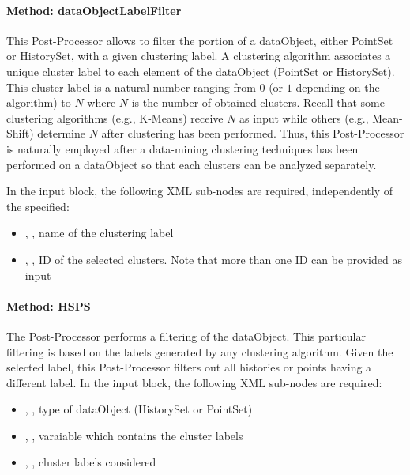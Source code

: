 \paragraph{Method: dataObjectLabelFilter}
This Post-Processor allows to filter the portion of a dataObject, either PointSet or HistorySet, with a given clustering label.
A clustering algorithm associates a unique cluster label to each element of the dataObject (PointSet or HistorySet).
This cluster label is a natural number ranging from $0$ (or $1$ depending on the algorithm) to $N$ where $N$ is the number of obtained clusters.
Recall that some clustering algorithms (e.g., K-Means) receive $N$ as input while others (e.g., Mean-Shift) determine $N$ after clustering has been performed.
Thus, this Post-Processor is naturally employed after a data-mining clustering techniques has been performed on a dataObject so that each clusters
can be analyzed separately.

In the  input block, the following XML sub-nodes are required,
independently of the  specified:

\begin{itemize}
   \item {}, , name of the clustering label
   \item {}, , ID of the selected clusters. Note that more than one ID can be provided as input
\end{itemize}

\paragraph{Method: HSPS}
The  Post-Processor performs a filtering of the dataObject. This particular filtering is based on the labels generated by any clustering algorithm.
Given the selected label, this Post-Processor filters out all histories or points having a different label.
In the  input block, the following XML sub-nodes are required:

\begin{itemize}
   \item {}, , type of dataObject (HistorySet or PointSet)
   \item {}, , varaiable which contains the cluster labels
   \item {}, , cluster labels considered
\end{itemize}

